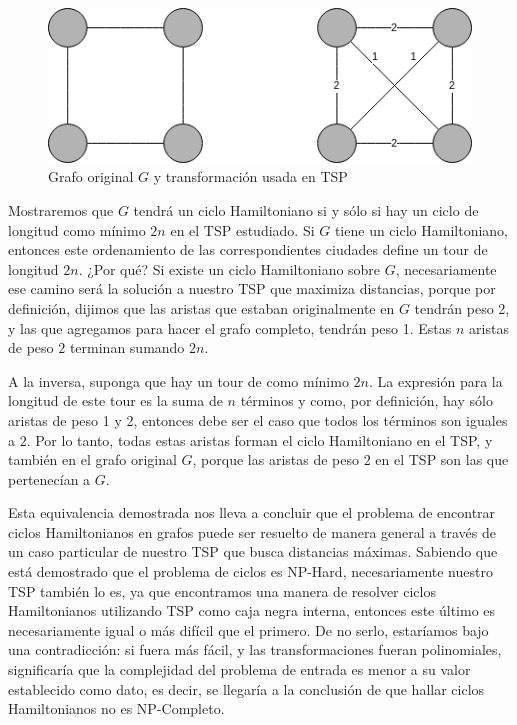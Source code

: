 \documentclass{article}
\begin{document}
\begin{figure}[H]
    \centering
    \includegraphics[scale=0.7]{res/tsp.png} 
    \caption{Grafo original $G$ y transformación usada en TSP}
\end{figure}
Mostraremos que $G$ tendrá un ciclo Hamiltoniano si y sólo si hay un ciclo de longitud como mínimo $2n$ en el TSP estudiado. Si $G$ tiene un ciclo Hamiltoniano, entonces este ordenamiento de las correspondientes ciudades define un tour de longitud $2n$. ¿Por qué? Si existe un ciclo Hamiltoniano sobre $G$, necesariamente ese camino será la solución a nuestro TSP que maximiza distancias, porque por definición, dijimos que las aristas que estaban originalmente en $G$ tendrán peso 2, y las que agregamos para hacer el grafo completo, tendrán peso 1. Estas $n$ aristas de peso $2$ terminan sumando $2n$.

A la inversa, suponga que hay un tour de como mínimo $2n$. La expresión para la longitud de este tour es la suma de $n$ términos y como, por definición, hay sólo aristas de peso 1 y 2, entonces debe ser el caso que todos los términos son iguales a $2$. Por lo tanto, todas estas aristas forman el ciclo Hamiltoniano en el TSP, y también en el grafo original $G$, porque las aristas de peso $2$ en el TSP son las que pertenecían a $G$.

Esta equivalencia demostrada nos lleva a concluir que el problema de encontrar ciclos Hamiltonianos en grafos puede ser resuelto de manera general a través de un caso particular de nuestro TSP que busca distancias máximas. Sabiendo que está demostrado que el problema de ciclos es NP-Hard, necesariamente nuestro TSP también lo es, ya que encontramos una manera de resolver ciclos Hamiltonianos utilizando TSP como caja negra interna, entonces este último es necesariamente igual o más difícil que el primero. De no serlo, estaríamos bajo una contradicción: si fuera más fácil, y las transformaciones fueran polinomiales, significaría que la complejidad del problema de entrada es menor a su valor establecido como dato, es decir, se llegaría a la conclusión de que hallar ciclos Hamiltonianos no es NP-Completo.
\end{document}
